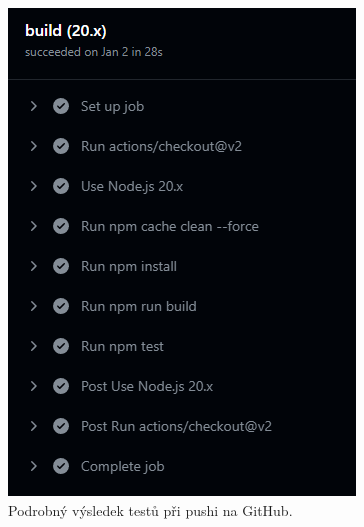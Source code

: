 \begin{frame}
\begin{figure}
        \includegraphics[height=0.6\textheight]{../resources/tests-github-20.png}
        \caption{Podrobný výsledek testů při pushi na GitHub.}
    \end{figure}

\end{frame}
